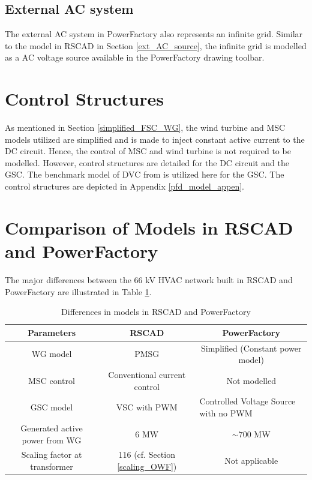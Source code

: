 \subsection{External AC system}
The external \gls{AC} system in PowerFactory also represents an infinite grid. Similar to the model in RSCAD in Section \ref{ext_AC_source}, the infinite grid is modelled as a \gls{AC} voltage source available in the PowerFactory drawing toolbar. 

\section{Control Structures}
As mentioned in Section \ref{simplified_FSC_WG}, the wind turbine and \gls{MSC} models utilized are simplified and is made to inject constant active current to the \gls{DC} circuit. Hence, the control of \gls{MSC} and wind turbine is not required to be modelled. However, control structures are detailed for the \gls{DC} circuit and the \gls{GSC}. The benchmark model of \gls{DVC} from \cite{erlich_description_2018} is utilized here for the \gls{GSC}. The control structures are depicted in Appendix \ref{pfd_model_appen}.      

\section{Comparison of Models in RSCAD and PowerFactory }
The major differences between the 66 kV \gls{HVAC} network built in RSCAD and PowerFactory are illustrated in Table \ref{tab:Comp_RSCAD_PFD_Para}. 
\vspace{-1mm}
\begingroup
\renewcommand{\arraystretch}{1.2} %
\begin{table}[H]
\centering
\begin{tabular}{|c|c|c|}
\hline
\textbf{Parameters}   & \textbf{RSCAD}         & \textbf{PowerFactory}             \\ \hline
WG model      & PMSG   & Simplified (Constant power model)                                \\ \hline
MSC control   & Conventional current control     & Not modelled           \\ \hline
GSC model & {VSC with PWM} & \multicolumn{1}{l|}{Controlled Voltage Source with no PWM}  \\ \hline
Generated active power from WG  & 6 MW  & $\sim{700}$ MW                                    \\ \hline
Scaling factor at transformer & 116 (cf. Section \ref{scaling_OWF}) & Not applicable                           \\ \hline
\end{tabular}
\caption{Differences in models in RSCAD and PowerFactory}
\label{tab:Comp_RSCAD_PFD_Para}
\end{table}
\endgroup

